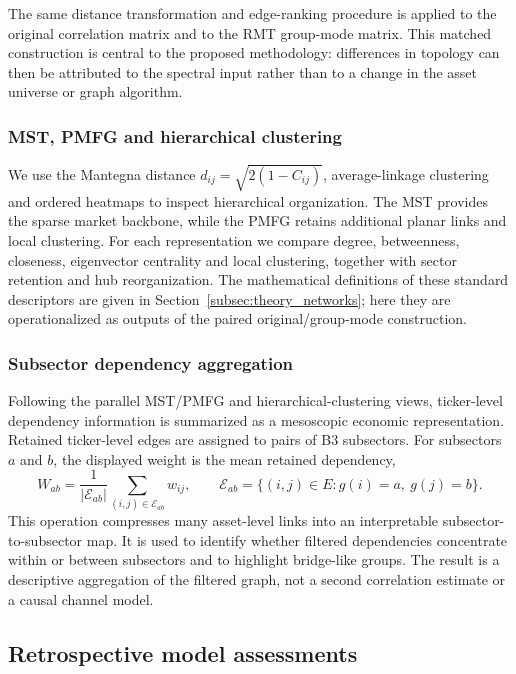 The same distance transformation and edge-ranking procedure is applied to the original correlation matrix and to the RMT group-mode matrix. This matched construction is central to the proposed methodology: differences in topology can then be attributed to the spectral input rather than to a change in the asset universe or graph algorithm.

\subsubsection{MST, PMFG and hierarchical clustering}
\label{subsec:distance_clustering_method}

We use the Mantegna distance $d_{ij}=\sqrt{2(1-C_{ij})}$, average-linkage clustering and ordered heatmaps to inspect hierarchical organization. The MST provides the sparse market backbone, while the PMFG retains additional planar links and local clustering. For each representation we compare degree, betweenness, closeness, eigenvector centrality and local clustering, together with sector retention and hub reorganization. The mathematical definitions of these standard descriptors are given in Section~\ref{subsec:theory_networks}; here they are operationalized as outputs of the paired original/group-mode construction.

\subsubsection{Subsector dependency aggregation}
\label{subsec:subsector_network_method}

Following the parallel MST/PMFG and hierarchical-clustering views, ticker-level dependency information is summarized as a mesoscopic economic representation. Retained ticker-level edges are assigned to pairs of B3 subsectors. For subsectors $a$ and $b$, the displayed weight is the mean retained dependency,
\begin{equation}
W_{ab}=\frac{1}{|\mathcal{E}_{ab}|}\sum_{(i,j)\in\mathcal{E}_{ab}}w_{ij},
\qquad \mathcal{E}_{ab}=\{(i,j)\in E:g(i)=a,\ g(j)=b\}.
\end{equation}
This operation compresses many asset-level links into an interpretable subsector-to-subsector map. It is used to identify whether filtered dependencies concentrate within or between subsectors and to highlight bridge-like groups. The result is a descriptive aggregation of the filtered graph, not a second correlation estimate or a causal channel model.

\subsection{Retrospective model assessments}
\label{subsec:experimental_framework}
\label{subsec:forecast_metrics}
\label{subsec:evaluation_method}


